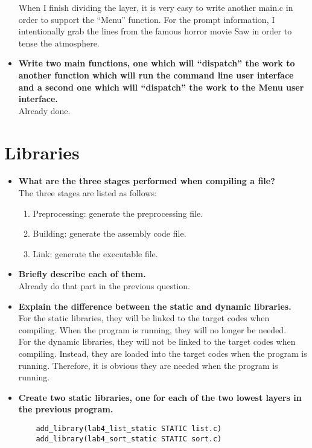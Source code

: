 \documentclass{article}
\begin{document}
\begin{spacing}{1.5}
\begin{itemize}
    When I finish dividing the layer, it is very easy to write another main.c in order to support the ``Menu'' function. For the prompt information, I intentionally grab the lines from the famous horror movie Saw in order to tense the atmosphere.
    \item\textbf{Write two main functions, one which will “dispatch” the work to another function which will run the command line user interface and a second one which will “dispatch” the work to the Menu user interface.}\\
    Already done.
\end{itemize}
\section{Libraries}
\begin{itemize}
	\item\textbf{What are the three stages performed when compiling a file?}\\
	The three stages are listed as follows:
	\begin{enumerate}
		\item Preprocessing: generate the preprocessing file.\\
		\item Building: generate the assembly code file.\\
		\item Link: generate the executable file.
	\end{enumerate}
	\item \textbf{Briefly describe each of them.}\\
	Already do that part in the previous question.
	\item \textbf{Explain the difference between the static and dynamic libraries.}\\
	For the static libraries, they will be linked to the target codes when compiling. When the program is running, they will no longer be needed.\\
	For the dynamic libraries, they will not be linked to the target codes when compiling. Instead, they are loaded into the target codes when the program is running. Therefore, it is obvious they are needed when the program is running.
	\item \textbf{Create two static libraries, one for each of the two lowest layers in the previous program.}
	\begin{lstlisting}
	add_library(lab4_list_static STATIC list.c)
	add_library(lab4_sort_static STATIC sort.c)
	\end{lstlisting}

\end{itemize}
\end{spacing}
\end{document}
